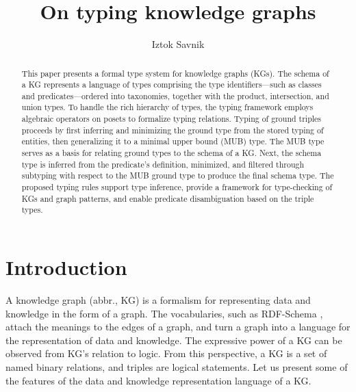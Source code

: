\documentclass[runningheads]{llncs}
\begin{document}
\title{On typing knowledge graphs}

\author{Iztok Savnik} 



\maketitle

\begin{abstract}
This paper presents a formal type system for knowledge graphs (KGs).
The schema of a KG represents a language of types comprising the type
identifiers---such as classes and predicates---ordered into
taxonomies, together with the product, intersection, and union
types. To handle the rich hierarchy of types, the typing framework
employs algebraic operators on posets to formalize typing relations.
Typing of ground triples proceeds by first inferring and minimizing
the ground type from the stored typing of entities, then generalizing
it to a minimal upper bound (MUB) type. The MUB type serves as a basis
for relating ground types to the schema of a KG. Next, the schema type
is inferred from the predicate’s definition, minimized, and filtered
through subtyping with respect to the MUB ground type to produce the
final schema type. The proposed typing rules support type inference,
provide a framework for type-checking of KGs and graph patterns, and
enable predicate disambiguation based on the triple types.

\end{abstract}


\thispagestyle{headings}

\section{Introduction}

A knowledge graph (abbr., KG) is a formalism for representing data and
knowledge in the form of a graph. The vocabularies, such as RDF-Schema
\cite{rdfschema}, attach the meanings to the edges of a graph, and
turn a graph into a language for the representation of data and
knowledge. The expressive power of a KG can be observed from KG's
relation to logic. From this perspective, a KG is a set of named
binary relations, and triples are logical statements. Let us present
some of the features of the data and knowledge representation language
of a KG.
\end{document}
